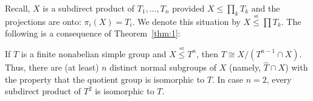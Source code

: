 Recall, $X$ is a subdirect product of $T_1, \dots, T_n$ provided
 $X \leq \prod\limits_k T_k $ and the projections are onto: $\pi_i(X)= T_i$.  We
denote this situation by  
$X \stackrel{_{\mathrm{sd}}}{\leq} \prod T_k$.
The following is a consequence of Theorem~\ref{thm:1}:
\begin{corollary}
  If $T$ is a finite nonabelian simple group and 
$X \stackrel{_{\mathrm{sd}}}{\leq} T^n$,
  then $T \cong X/ (T^{n-1}\cap X)$.  Thus, there are (at least) $n$ distinct normal
  subgroups of $X$ (namely,  $\hat{T}\cap X$) with the property that the
  quotient group is isomorphic to $T$.  In case $n=2$, every subdirect product
  of $T^2$ is isomorphic to $T$.
\end{corollary}
